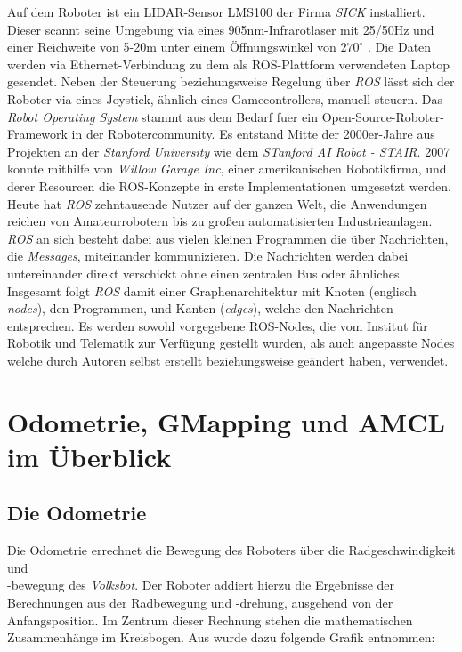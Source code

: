 \documentclass[11pt,a4paper]{article}
\begin{document}
Auf dem Roboter ist ein LIDAR-Sensor LMS100 der Firma \textit{SICK} installiert. Dieser scannt seine Umgebung via eines 905nm-Infrarotlaser 
mit 25/50Hz und einer Reichweite von 5-20m unter einem Öffnungswinkel von $270^\circ$ \cite{website:LMS100}. Die Daten werden via Ethernet-Verbindung zu dem als ROS-Plattform verwendeten
Laptop gesendet. Neben der Steuerung beziehungsweise Regelung über \textit{ROS} lässt sich der Roboter via eines Joystick, ähnlich eines Gamecontrollers, manuell steuern.
Das \textit{Robot Operating System}  stammt aus dem Bedarf fuer ein Open-Source-Roboter-Framework in der Robotercommunity.
Es entstand Mitte der 2000er-Jahre aus Projekten an der \textit{Stanford University} wie dem \textit{STanford AI Robot - STAIR}.
2007 konnte mithilfe von \textit{Willow Garage Inc}, einer amerikanischen Robotikfirma, und derer
Resourcen die ROS-Konzepte in erste Implementationen umgesetzt werden. Heute hat \textit{ROS} zehntausende Nutzer auf der ganzen Welt,
die Anwendungen reichen von Amateurrobotern bis zu großen automatisierten Industrieanlagen. 
\textit{ROS} an sich besteht dabei aus vielen kleinen Programmen die über Nachrichten, die \textit{Messages}, miteinander kommunizieren.
Die Nachrichten werden dabei untereinander direkt verschickt ohne einen zentralen Bus oder ähnliches. Insgesamt
folgt \textit{ROS} damit einer Graphenarchitektur mit Knoten (englisch \textit{nodes}), den Programmen, und Kanten (\textit{edges}), welche den Nachrichten entsprechen. \cite{quigley2015programming}
Es werden sowohl vorgegebene ROS-Nodes, die vom Institut für Robotik und Telematik zur Verfügung gestellt wurden, als auch angepasste Nodes welche durch Autoren selbst erstellt beziehungsweise
geändert haben, verwendet. 
\section{Odometrie, GMapping und AMCL im Überblick}
\subsection*{Die Odometrie}
Die Odometrie errechnet die Bewegung des Roboters über die Radgeschwindigkeit und \\ -bewegung 
des \textit{Volksbot}. Der Roboter addiert hierzu die Ergebnisse der Berechnungen aus der Radbewegung und -drehung, ausgehend von der Anfangsposition.
Im Zentrum dieser Rechnung stehen die mathematischen Zusammenhänge im Kreisbogen. 
Aus \cite{website:dresden} wurde dazu folgende Grafik entnommen:
\end{document}
